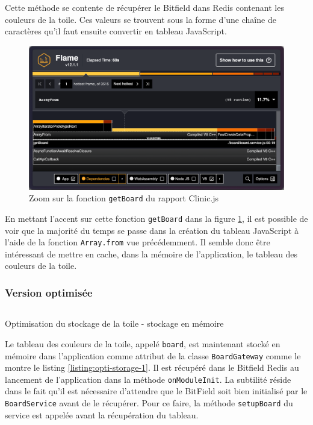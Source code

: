 Cette méthode se contente de récupérer le Bitfield dans Redis contenant les couleurs de la toile. Ces valeurs se trouvent sous la forme d'une chaîne de caractères qu'il faut ensuite convertir en tableau JavaScript.

\begin{figure}[H]
  \centering
  \includegraphics[width=1\textwidth]{./assets/figures/flame/flame3-getBoard.png}
  \caption{Zoom sur la fonction \texttt{getBoard} du rapport Clinic.js}
  \label{fig:flame3-getBoard}
\end{figure}

En mettant l'accent sur cette fonction \texttt{getBoard} dans la figure \ref{fig:flame3-getBoard}, il est possible de voir que la majorité du temps se passe dans la création du tableau JavaScript à l'aide de la fonction \texttt{Array.from} vue précédemment. Il semble donc être intéressant de mettre en cache, dans la mémoire de l'application, le tableau des couleurs de la toile.

\subsubsection{Version optimisée}

\begin{listing}[H]
  \inputminted[highlightlines={4,10,11},linenos]{ts}{assets/figures/opti-storage-1.ts}
  \caption{Optimisation du stockage de la toile - stockage en mémoire}
  \label{listing:opti-storage-1}
\end{listing}

Le tableau des couleurs de la toile, appelé \texttt{board}, est maintenant stocké en mémoire dans l'application comme attribut de la classe \texttt{BoardGateway} comme le montre le listing \ref{listing:opti-storage-1}. Il est récupéré dans le Bitfield Redis au lancement de l'application dans la méthode \texttt{onModuleInit}. La subtilité réside dans le fait qu'il est nécessaire d'attendre que le BitField soit bien initialisé par le \texttt{BoardService} avant de le récupérer. Pour ce faire, la méthode \texttt{setupBoard} du service est appelée avant la récupération du tableau.

